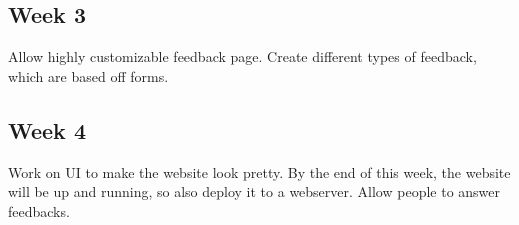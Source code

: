 \documentclass[a4paper]{article}
\begin{document}
\subsection{Week 3} %
\label{sub:Week 3}
Allow highly customizable feedback page. Create different types of feedback, which are based off forms.
\subsection{Week 4} %
\label{sub:Week 4}
Work on UI to make the website look pretty. By the end of this week, the website will be up and running, so also deploy it to a webserver. Allow people to answer feedbacks.
\end{document}
